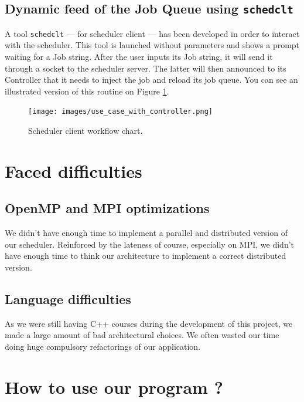 \documentclass[a4paper,11pt]{article}
\begin{document}
\subsection{Dynamic feed of the Job Queue using \texttt{schedclt}}\label{schedclt_implementation}

A tool \texttt{schedclt} --- for scheduler client --- has been developed in order to interact with the scheduler. This tool is launched without parameters and shows a prompt waiting for a Job string. After the user inputs its Job string, it will send it through a socket to the scheduler server. The latter will then announced to its Controller that it needs to inject the job and reload its job queue. You can see an illustrated version of this routine on Figure \ref{schedclt_implementation_png}.

\begin{center}
\begin{figure}[ht]
\texttt{[image: images/use\_case\_with\_controller.png]}
\caption{Scheduler client workflow chart.}
\label{schedclt_implementation_png}
\end{figure}
\end{center}

\clearpage

\section{Faced difficulties}

\subsection{OpenMP and MPI optimizations}

We didn't have enough time to implement a parallel and distributed version of our scheduler. Reinforced by the lateness of course, especially on MPI, we didn't have enough time to think our architecture to implement a correct distributed version.

\subsection{Language difficulties}

As we were still having C++ courses during the development of this project, we made a large amount of bad architectural choices. We often wasted our time doing huge compulsory refactorings of our application.


\clearpage

\section{How to use our program ?}
\end{document}

